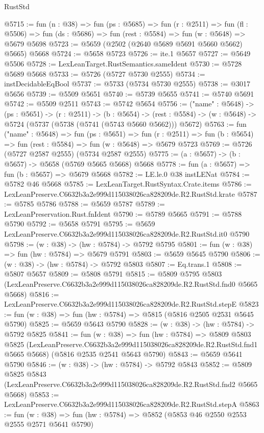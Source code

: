 \begin{lexlean}{RustStd}
\begin{coremodule}
@5715 := fun (n : @38) =>
  fun (ps : @5685) =>
  fun (r : @2511) =>
  fun (fl : @5506) => fun (ds : @5686) => fun (rest : @5584) => fun (w : @5648) => @5679 @5698
@5723 := @5659 (@2502 (@2640 @5689 @5691 @5660 @5662) @5665) @5668
@5724 := @5658 @5723
@5726 := ite.{1} @5657
@5727 := @5649 @5506
@5728 := LexLeanTarget.RustSemantics.sameIdent
@5730 := @5728 @5689 @5668
@5733 := @5726 (@5727 @5730 @2555)
@5734 := instDecidableEqBool
@5737 := @5733 (@5734 @5730 @2555)
@5738 := @3017 @5656
@5739 := @5509 @5651
@5740 := @5739 @5655
@5741 := @5740 @5691
@5742 := @5509 @2511
@5743 := @5742 @5654
@5756 := ("name" : @5648) ->
  (ps : @5651) ->
  (r : @2511) ->
  (b : @5654) ->
  (rest : @5584) -> (w : @5648) -> @5724 (@5737 (@5738 (@5741 (@5743 @5660 @5662))) @5672)
@5763 := fun ("name" : @5648) =>
  fun (ps : @5651) =>
  fun (r : @2511) => fun (b : @5654) => fun (rest : @5584) => fun (w : @5648) => @5679 @5723
@5769 := @5726 (@5727 @2587 @2555) (@5734 @2587 @2555)
@5775 := (a : @5657) -> (b : @5657) -> @5658 (@5769 @5665 @5668) @5668
@5778 := fun (a : @5657) => fun (b : @5657) => @5679 @5668
@5782 := LE.le.{0} @38 instLENat
@5784 := @5782 @46 @5668
@5785 := LexLeanTarget.RustSyntax.Crate.items
@5786 := LexLeanPreserve.C6632b3a2e999d115038026ca828209de.R2.RustStd.krate
@5787 := @5785 @5786
@5788 := @5659 @5787
@5789 := LexLeanPreservation.Rust.fnIdent
@5790 := @5789 @5665
@5791 := @5788 @5790
@5792 := @5658 @5791
@5795 := @5659 LexLeanPreserve.C6632b3a2e999d115038026ca828209de.R2.RustStd.it0 @5790
@5798 := (w : @38) -> (hw : @5784) -> @5792 @5795
@5801 := fun (w : @38) => fun (hw : @5784) => @5679 @5791
@5803 := @5659 @5645 @5790
@5806 := (w : @38) -> (hw : @5784) -> @5792 @5803
@5807 := Eq.trans.{1}
@5808 := @5807 @5657
@5809 := @5808 @5791
@5815 := @5809
    @5795
    @5803
    (LexLeanPreserve.C6632b3a2e999d115038026ca828209de.R2.RustStd.fnd0 @5665 @5668)
@5816 := LexLeanPreserve.C6632b3a2e999d115038026ca828209de.R2.RustStd.stepE
@5823 := fun (w : @38) => fun (hw : @5784) => @5815 (@5816 @2505 @2531 @5645 @5790)
@5825 := @5659 @5643 @5790
@5828 := (w : @38) -> (hw : @5784) -> @5792 @5825
@5841 := fun (w : @38) =>
  fun (hw : @5784) =>
  @5809
    @5803
    @5825
    (LexLeanPreserve.C6632b3a2e999d115038026ca828209de.R2.RustStd.fnd1 @5665 @5668)
    (@5816 @2535 @2541 @5643 @5790)
@5843 := @5659 @5641 @5790
@5846 := (w : @38) -> (hw : @5784) -> @5792 @5843
@5852 := @5809
    @5825
    @5843
    (LexLeanPreserve.C6632b3a2e999d115038026ca828209de.R2.RustStd.fnd2 @5665 @5668)
@5853 := LexLeanPreserve.C6632b3a2e999d115038026ca828209de.R2.RustStd.stepA
@5863 := fun (w : @38) => fun (hw : @5784) => @5852 (@5853 @46 @2550 @2553 @2555 @2571 @5641 @5790)

\end{coremodule}
\end{lexlean}

